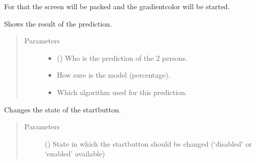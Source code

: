 \documentclass[letterpaper,10pt,english]{sphinxmanual}
\begin{document}
\begin{fulllineitems}
\begin{fulllineitems}
\sphinxAtStartPar
For that the screen will be packed and the gradient\sphinxhyphen{}color will be started.

\end{fulllineitems}


\begin{fulllineitems}
\label{\detokenize{anoog.automation:anoog.automation.graphical_user_interface.Predict_Window.show_result}}
\sphinxAtStartPar
Shows the result of the prediction.
\begin{quote}\begin{description}
\item[{Parameters}] \leavevmode\begin{itemize}
\item {} 
\sphinxAtStartPar
{} () \textendash{} Who is the prediction of the 2 persons.

\item {} 
\sphinxAtStartPar
{} \textendash{} How sure is the model (percentage).

\item {} 
\sphinxAtStartPar
{} \textendash{} Which algorithm used for this prediction.

\end{itemize}

\end{description}\end{quote}

\end{fulllineitems}


\begin{fulllineitems}
\label{\detokenize{anoog.automation:anoog.automation.graphical_user_interface.Predict_Window.start_button_change}}
\sphinxAtStartPar
Changes the state of the start\sphinxhyphen{}button.
\begin{quote}\begin{description}
\item[{Parameters}] \leavevmode
\sphinxAtStartPar
{} () \textendash{} State in which the start\sphinxhyphen{}button should be changed (‘disabled’ or ‘enabled’ available)


\end{description}
\end{quote}
\end{fulllineitems}
\end{fulllineitems}
\end{document}
